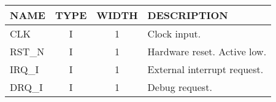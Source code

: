 {
\footnotesize
\begin{tabularx}{0.9\textwidth}{|l|c|c|X|}
  \hline
  \cellcolor{gray!20}\textbf{NAME} & \cellcolor{gray!20}\textbf{TYPE} & \cellcolor{gray!20}\textbf{WIDTH} & \cellcolor{gray!20}\textbf{DESCRIPTION} \\
  \hline
  CLK & I & 1 & Clock input. \\
  \hline
  RST\_N & I & 1 & Hardware reset. Active low. \\
  \hline
  IRQ\_I & I & 1 & External interrupt request. \\
  \hline
  DRQ\_I & I & 1 & Debug request. \\
  \hline
\end{tabularx}
}
